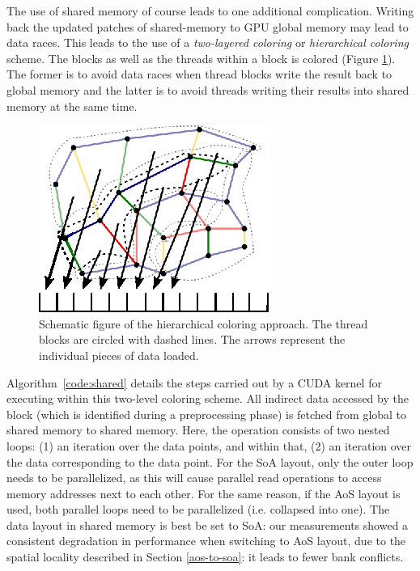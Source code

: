 The use of shared memory of course leads to one additional complication. 
Writing back the updated patches of shared-memory to GPU global memory may lead 
to data races. This leads to the use of a \emph{two-layered coloring} or 
\emph{hierarchical coloring}~\cite{op2} scheme. The blocks as well as the 
threads within a block is colored (Figure \ref{fig:unstructured_hier}). The 
former is to avoid data races when thread blocks write the result back to 
global memory and the latter is to avoid threads writing their results into 
shared memory at the same time. 

\begin{figure}[Htpb]
  \centering
  \includegraphics{fig/svg/unstructured_hier.eps}
  \caption{Schematic figure of the hierarchical coloring approach. The thread
  blocks are circled with dashed lines. The arrows represent the individual 
  pieces of data loaded.}
  \label{fig:unstructured_hier}
\end{figure}

Algorithm~\ref{code:shared} details the steps carried out by a CUDA kernel for 
executing within this two-level coloring scheme. All indirect data accessed 
by the block (which is identified during a preprocessing phase) is fetched from 
global to shared memory to shared memory. Here, the operation consists of two 
nested loops: (1) an iteration over the data points, and within that, (2) an 
iteration over the data corresponding to the data point. For the SoA layout, 
only the outer loop needs to be parallelized, as this will cause parallel 
read operations to access memory addresses next to each other. For the same 
reason, if the AoS layout is used, both parallel loops need to be parallelized
(i.e. collapsed into one). The data layout in shared memory is best be set to SoA: 
our measurements showed a consistent degradation in performance when switching 
to AoS layout, due to the spatial locality described in Section 
\ref{aos-to-soa}: it leads to fewer bank conflicts.

